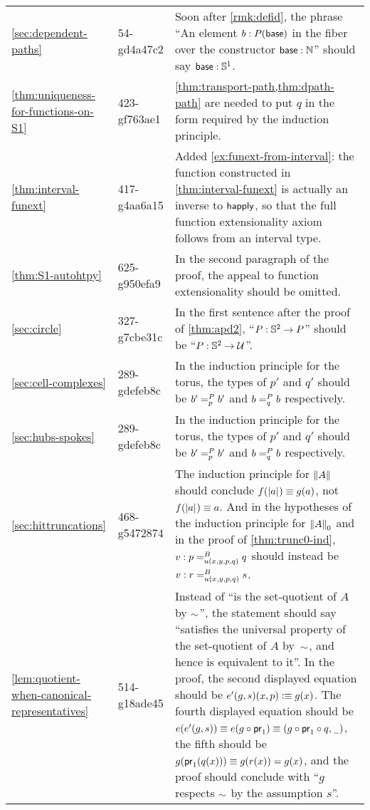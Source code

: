 \documentclass[
%
%
11pt %
]{article}
\begin{document}
\begin{longtable}{llp{10.5cm}}
  \cref{sec:dependent-paths}
  & 54-gd4a47c2
  & Soon after \cref{rmk:defid}, the phrase ``An element $b:P(\base)$ in the fiber over the constructor $\base:\nat$'' should say $\base:\Sn^1$.\\
  \cref{thm:uniqueness-for-functions-on-S1}
  & 423-gf763ae1
  & \cref{thm:transport-path,thm:dpath-path} are needed to put $q$ in the form required by the induction principle.\\
  \cref{thm:interval-funext}
  & 417-g4aa6a15
  & Added \cref{ex:funext-from-interval}: the function constructed in \cref{thm:interval-funext} is actually an inverse to $\happly$, so that the full function extensionality axiom follows from an interval type.\\
  \cref{thm:S1-autohtpy}
  & 625-g950efa9
  & In the second paragraph of the proof, the appeal to function extensionality should be omitted.\\
  \cref{sec:circle}
  & 327-g7cbe31c
  & In the first sentence after the proof of \cref{thm:apd2}, ``$P:\Sn^2\to P$'' should be ``$P:\Sn^2\to\type$''.\\
  \cref{sec:cell-complexes}
  & 289-gdefeb8c
  & In the induction principle for the torus, the types of $p'$ and $q'$ should be $\dpath P p {b'} {b'}$ and $\dpath P q b b$ respectively.\\
  \cref{sec:hubs-spokes}
  & 289-gdefeb8c
  & In the induction principle for the torus, the types of $p'$ and $q'$ should be $\dpath P p {b'} {b'}$ and $\dpath P q b b$ respectively.\\
  \cref{sec:hittruncations}
  & 468-g5472874
  & The induction principle for $\brck{A}$ should conclude $f(\bproj a)\jdeq g(a)$, not $f(\bproj a)\jdeq a$.  And in the hypotheses of the induction principle for $\trunc0 A$ and in the proof of \cref{thm:trunc0-ind}, $v:\dpath{B}{u(x,y,p,q)}{p}{q}$ should instead be $v:\dpath{B}{u(x,y,p,q)}{r}{s}$.\\
  \cref{lem:quotient-when-canonical-representatives}
  & 514-g18ade45
  & Instead of ``is the set-quotient of $A$ by $\eqr$'', the statement should say ``satisfies the universal property of the set-quotient of $A$ by~$\eqr$, and hence is equivalent to it''.
  In the proof, the second displayed equation should be $e'(g, s) (x,p) \defeq g(x)$.
  The fourth displayed equation should be $e(e'(g, s)) \jdeq e(g \circ \proj{1}) \jdeq (g \circ \proj{1} \circ q, {\nameless})$, the fifth should be $g(\proj{1}(q(x))) \jdeq g(r(x)) = g(x)$, and the proof should conclude with ``$g$ respects $\eqr$ by the assumption $s$''.\\

\end{longtable}
\end{document}
